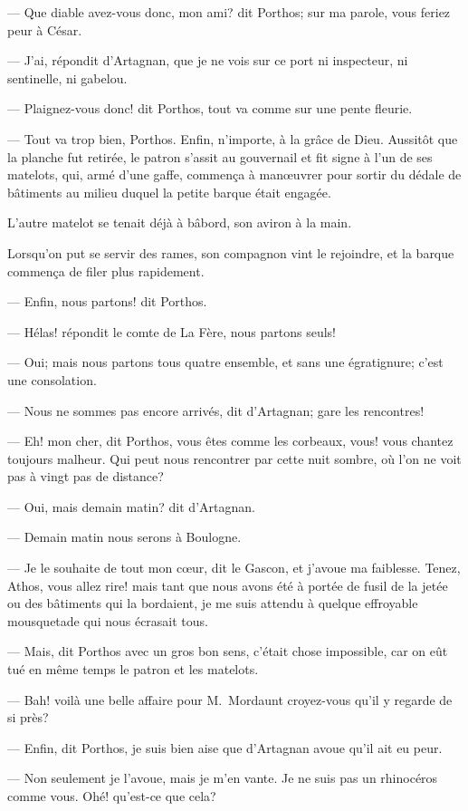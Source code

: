 — Que diable avez-vous donc, mon ami? dit Porthos; sur ma parole, vous feriez peur à César.

— J'ai, répondit d'Artagnan, que je ne vois sur ce port ni inspecteur, ni sentinelle, ni gabelou.

— Plaignez-vous donc! dit Porthos, tout va comme sur une pente fleurie.

— Tout va trop bien, Porthos. Enfin, n'importe, à la grâce de Dieu.
Aussitôt que la planche fut retirée, le patron s'assit au gouvernail et fit signe à l'un de ses matelots, qui, armé d'une gaffe, commença à manœuvrer pour sortir du dédale de bâtiments au milieu duquel la petite barque était engagée.

L'autre matelot se tenait déjà à bâbord, son aviron à la main.

Lorsqu'on put se servir des rames, son compagnon vint le rejoindre, et la barque commença de filer plus rapidement.

— Enfin, nous partons! dit Porthos.

— Hélas! répondit le comte de La Fère, nous partons seuls!

— Oui; mais nous partons tous quatre ensemble, et sans une égratignure; c'est une consolation.

— Nous ne sommes pas encore arrivés, dit d'Artagnan; gare les rencontres!

— Eh! mon cher, dit Porthos, vous êtes comme les corbeaux, vous! vous chantez toujours malheur. Qui peut nous rencontrer par cette nuit sombre, où l'on ne voit pas à vingt pas de distance?

— Oui, mais demain matin? dit d'Artagnan.

— Demain matin nous serons à Boulogne.

— Je le souhaite de tout mon cœur, dit le Gascon, et j'avoue ma faiblesse. Tenez, Athos, vous allez rire! mais tant que nous avons été à portée de fusil de la jetée ou des bâtiments qui la bordaient, je me suis attendu à quelque effroyable mousquetade qui nous écrasait tous.

— Mais, dit Porthos avec un gros bon sens, c'était chose impossible, car on eût tué en même temps le patron et les matelots.

— Bah! voilà une belle affaire pour M.~Mordaunt croyez-vous qu'il y regarde de si près?

— Enfin, dit Porthos, je suis bien aise que d'Artagnan avoue qu'il ait eu peur.

— Non seulement je l'avoue, mais je m'en vante. Je ne suis pas un rhinocéros comme vous. Ohé! qu'est-ce que cela?

